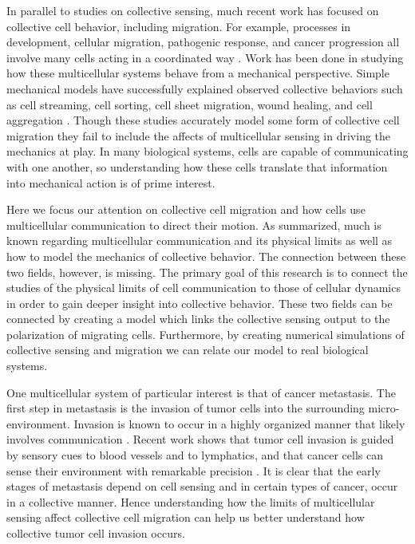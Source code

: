In parallel to studies on collective sensing, much recent work has focused on collective cell behavior, including migration. For example, processes in development, cellular migration, pathogenic response, and cancer progression all involve many cells acting in a coordinated way \cite{friedl2010plasticity,rasmussen2006quorum,boelens2014exosome,cheung2013collective,vader2014extracellular}. Work has been done in studying how these multicellular systems behave from a mechanical perspective. Simple mechanical models have successfully explained observed collective behaviors such as cell streaming, cell sorting, cell sheet migration, wound healing, and cell aggregation \cite{kabla2012collective,szabo2010collective,basan2013alignment,janulevicius2015short}. Though these studies accurately model some form of collective cell migration they fail to include the affects of multicellular sensing in driving the mechanics at play. In many biological systems, cells are capable of communicating with one another, so understanding how these cells translate that information into mechanical action is of prime interest.

Here we focus our attention on collective cell migration and how cells use multicellular communication to direct their motion. As summarized, much is known regarding multicellular communication and its physical limits as well as how to model the mechanics of collective behavior. The connection between these two fields, however, is missing. The primary goal of this research is to connect the studies of the physical limits of cell communication to those of cellular dynamics in order to gain deeper insight into collective behavior. These two fields can be connected by creating a model which links the collective sensing output to the polarization of migrating cells. Furthermore, by creating numerical simulations of collective sensing and migration we can relate our model to real biological systems.

One multicellular system of particular interest is that of cancer metastasis. The first step in metastasis is the invasion of tumor cells into the surrounding micro-environment. Invasion is known to occur in a highly organized manner that likely involves communication \cite{cheung2013collective,friedl2012classifying,vader2014extracellular}. Recent work shows that tumor cell invasion is guided by sensory cues to blood vessels and to lymphatics, and that cancer cells can sense their environment with remarkable precision \cite{shields2007autologous}. It is clear that the early stages of metastasis depend on cell sensing and in certain types of cancer, occur in a collective manner. Hence understanding how the limits of multicellular sensing affect collective cell migration can help us better understand how collective tumor cell invasion occurs.

